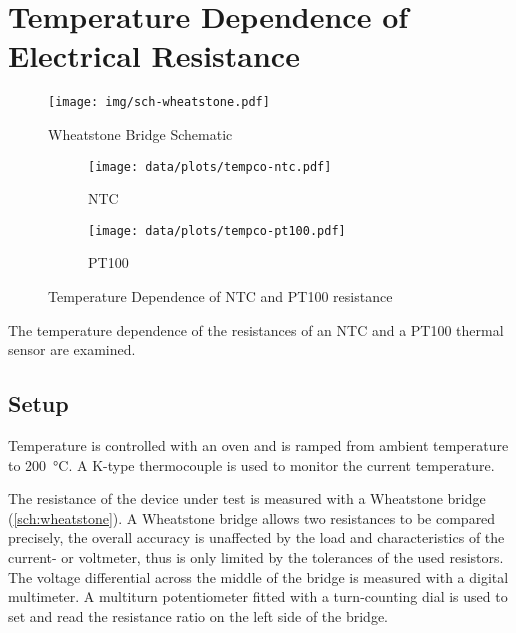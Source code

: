 \chapter{Temperature Dependence of Electrical Resistance}

\begin{figure}[tbp]
	\centering
	\texttt{[image: img/sch-wheatstone.pdf]}
	\caption{Wheatstone Bridge Schematic}
	\label{sch:wheatstone}
\end{figure}

\def\tcsubfigwidth{0.6\textwidth}
\def\tcgraphicswidth{1.1\textwidth}

\begin{figure}[tbp]
	\centering
	\begin{subfigure}{\tcsubfigwidth}
		\centering
		\texttt{[image: data/plots/tempco-ntc.pdf]}
		\caption{NTC}
		\label{plot:tempco:ntc}
	\end{subfigure}
	\begin{subfigure}{\tcsubfigwidth}
		\centering
		\texttt{[image: data/plots/tempco-pt100.pdf]}
		\caption{PT100}
		\label{plot:tempco:pt100}
	\end{subfigure}
	\caption{Temperature Dependence of NTC and PT100 resistance}
	\label{plot:tempco}
\end{figure}

The temperature dependence of the resistances of an NTC and a PT100 thermal sensor are examined.

\section{Setup}

Temperature is controlled with an oven and is ramped from ambient temperature to \SI{200}{\celsius}.
A K-type thermocouple is used to monitor the current temperature.

The resistance of the device under test is measured with a Wheatstone bridge (\autoref{sch:wheatstone}).
A Wheatstone bridge allows two resistances to be compared precisely, the overall accuracy is unaffected by the load and characteristics of the current- or voltmeter, thus is only limited by the tolerances of the used resistors.
The voltage differential across the middle of the bridge is measured with a digital multimeter.
A multiturn potentiometer fitted with a turn-counting dial is used to set and read the resistance ratio on the left side of the bridge.

